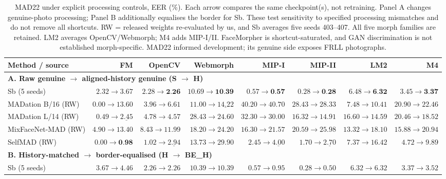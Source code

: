     \begin{table}[t]
    \centering\small
    \setlength{\tabcolsep}{2.4pt}
    \caption{MAD22 under explicit processing controls, EER (\%). Each arrow compares the same checkpoint(s), not retraining. Panel A changes genuine-photo processing; Panel B additionally equalises the border for Sb. These test sensitivity to specified processing mismatches and do not remove all shortcuts. RW = released weights re-evaluated by us, and Sb averages five seeds 403--407. All five morph families are retained. LM2 averages OpenCV/Webmorph; M4 adds MIP-I/II. FaceMorpher is shortcut-saturated, and GAN discrimination is not established morph-specific. MAD22 informed development; its genuine side exposes FRLL photographs.}
    \label{tab:mad22_results}
    \begin{tabular}{lrrrrrrr}
    \toprule
    Method / source & FM & OpenCV & Webmorph & MIP-I & MIP-II & LM2 & M4 \\
    \midrule
    \multicolumn{8}{l}{\textbf{A. Raw genuine $\rightarrow$ aligned-history genuine (S $\rightarrow$ H)}} \\
    Sb (5 seeds) & $2.32\!\to\!3.67$ & $2.28\!\to\!\textbf{2.26}$ & $10.69\!\to\!\textbf{10.39}$ & $0.57\!\to\!\textbf{0.57}$ & $0.28\!\to\!\textbf{0.28}$ & $6.48\!\to\!\textbf{6.32}$ & $3.45\!\to\!\textbf{3.37}$ \\
    MADation B/16 (RW) & $0.00\!\to\!13.60$ & $3.96\!\to\!6.61$ & $11.00\!\to\!\underline{14.22}$ & $40.20\!\to\!40.70$ & $28.43\!\to\!28.33$ & $7.48\!\to\!10.41$ & $20.90\!\to\!22.46$ \\
    MADation L/14 (RW) & $0.49\!\to\!\underline{2.45}$ & $4.78\!\to\!4.57$ & $28.43\!\to\!24.60$ & $32.30\!\to\!30.00$ & $16.32\!\to\!14.91$ & $16.60\!\to\!14.59$ & $20.46\!\to\!18.52$ \\
    MixFaceNet-MAD (RW) & $4.90\!\to\!13.40$ & $8.43\!\to\!11.99$ & $18.20\!\to\!24.20$ & $16.30\!\to\!21.57$ & $20.59\!\to\!25.98$ & $13.32\!\to\!18.10$ & $15.88\!\to\!20.94$ \\
    SelfMAD (RW) & $0.00\!\to\!\textbf{0.98}$ & $1.02\!\to\!\underline{2.94}$ & $13.73\!\to\!29.90$ & $2.45\!\to\!\underline{4.00}$ & $1.70\!\to\!\underline{2.70}$ & $7.37\!\to\!16.42$ & $4.72\!\to\!9.89$ \\
    \midrule
    \multicolumn{8}{l}{\textbf{B. History-matched $\rightarrow$ border-equalised (H $\rightarrow$ BE\_H)}} \\
    Sb (5 seeds) & $3.67\!\to\!4.46$ & $2.26\!\to\!2.26$ & $10.39\!\to\!10.39$ & $0.57\!\to\!0.95$ & $0.28\!\to\!0.50$ & $6.32\!\to\!6.32$ & $3.37\!\to\!3.52$ \\

\end{tabular}
\end{table}
